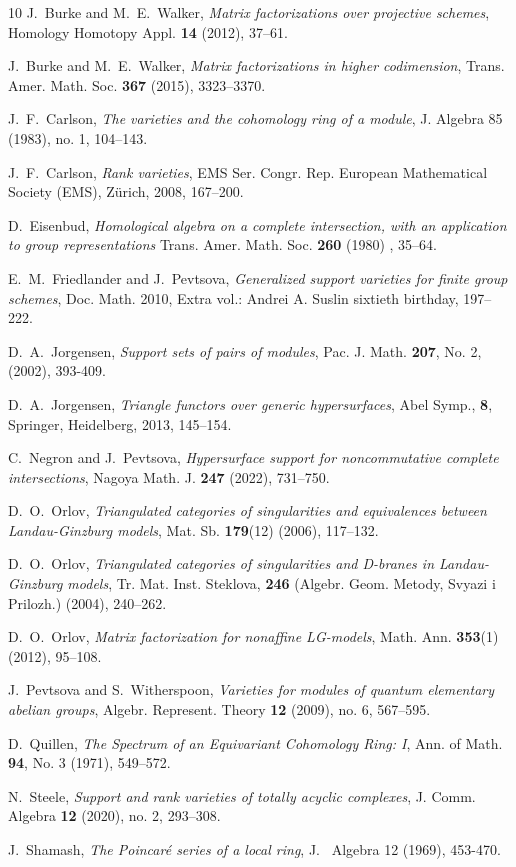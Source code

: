 \documentclass{amsart}[11pt]
\numberwithin{equation}{section}
\theoremstyle{plain}
\newtheorem*{Main Theorem}{Main Theorem}
\theoremstyle{definition}
\theoremstyle{remark}
\numberwithin{equation}{theorem}
\begin{document}
\begin{thebibliography}{10}
 J.~Burke and M.~E.~Walker, \emph{Matrix factorizations over projective schemes},
Homology Homotopy Appl. {\bf 14} (2012), 37--61.

 J.~Burke and M.~E.~Walker, \emph{Matrix factorizations in higher codimension},
Trans. Amer. Math. Soc. {\bf 367} (2015), 3323--3370.

 J.~F.~Carlson, {\em The varieties and the cohomology ring of a module}, 
J. Algebra 85 (1983), no. 1, 104--143.

 J.~F.~Carlson, \emph{Rank varieties},
EMS Ser. Congr. Rep. European Mathematical Society (EMS), Zürich, 2008, 167--200.

 D.~Eisenbud, {\em Homological algebra on a
complete intersection, with an application to group representations}
Trans. Amer. Math. Soc. {\bf 260} (1980) , 35--64.


 E.~M.~Friedlander and J.~Pevtsova, \emph{Generalized support varieties for finite group schemes},
Doc. Math. 2010, Extra vol.: Andrei A. Suslin sixtieth birthday, 197--222.

 D.~A.~Jorgensen, \emph{Support sets of pairs of modules}, Pac. J. Math. \textbf{207}, No. 2, (2002), 393-409.

 D.~A.~Jorgensen, \emph{Triangle functors over generic hypersurfaces},
Abel Symp., {\bf 8}, Springer, Heidelberg, 2013, 145--154.

 C.~Negron and J.~Pevtsova, \emph{Hypersurface support for noncommutative complete intersections},
Nagoya Math. J. {\bf 247} (2022), 731--750.

 D.~O.~Orlov, \emph{Triangulated categories of singularities and equivalences between Landau-Ginzburg models}, Mat. Sb. {\bf 179}(12) (2006), 117--132.

 D.~O.~Orlov, \emph{Triangulated categories of singularities and D-branes in Landau-Ginzburg models}, Tr. Mat. Inst. Steklova, {\bf 246} (Algebr. Geom. Metody, Svyazi i Prilozh.) (2004), 240--262.

 D.~O.~Orlov, \emph{Matrix factorization for nonaffine LG-models}, Math. Ann. {\bf 353}(1) (2012), 95--108.

 J.~Pevtsova and S.~Witherspoon, \emph{Varieties for modules of quantum elementary abelian groups},
Algebr. Represent. Theory {\bf 12} (2009), no. 6, 567--595.


 D.~Quillen, \emph{The Spectrum of an Equivariant Cohomology Ring: I},
Ann. of Math. {\bf 94}, No. 3 (1971), 549--572.

 N.\ Steele, \emph{Support and rank varieties of totally acyclic complexes}, J. Comm. Algebra {\bf 12} (2020), no. 2, 293--308.

J.\ Shamash, \emph{The Poincar\'e series
of a local ring}, J. \ Algebra 12 (1969), 453-470.

\end{thebibliography}
\end{document}
